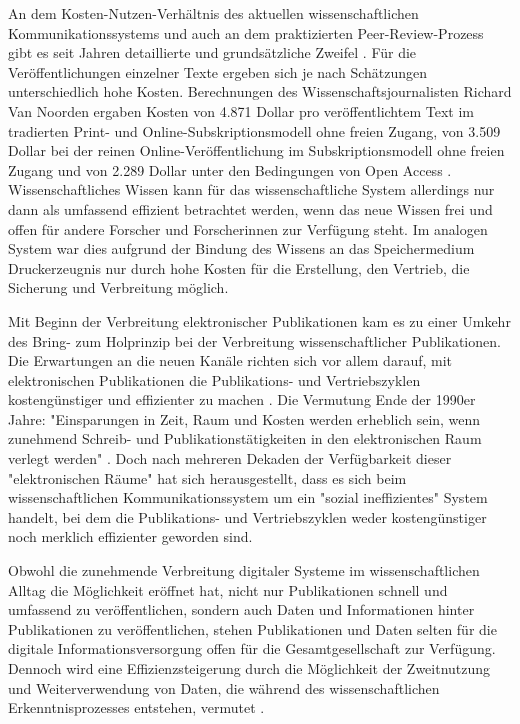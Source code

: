 An dem Kosten-Nutzen-Verhältnis des aktuellen wissenschaftlichen Kommunikationssystems und auch an dem praktizierten Peer-Review-Prozess \cite{Smith_2006} gibt es seit Jahren detaillierte und grundsätzliche Zweifel \cite{Brembs_2013a}. Für die Veröffentlichungen einzelner Texte ergeben sich je nach Schätzungen unterschiedlich hohe Kosten. Berechnungen des Wissenschaftsjournalisten Richard Van Noorden ergaben Kosten von 4.871 Dollar pro veröffentlichtem Text im tradierten Print- und Online-Subskriptionsmodell ohne freien Zugang, von 3.509 Dollar bei der reinen Online-Veröffentlichung im Subskriptionsmodell ohne freien Zugang und von 2.289 Dollar unter den Bedingungen von Open Access \cite{Van_Noorden_2013}. Wissenschaftliches Wissen kann für das wissenschaftliche System allerdings nur dann als umfassend effizient betrachtet werden, wenn das neue Wissen frei und offen für andere Forscher und Forscherinnen zur Verfügung steht. Im analogen System war dies aufgrund der Bindung des Wissens an das Speichermedium Druckerzeugnis nur durch hohe Kosten für die Erstellung, den Vertrieb, die Sicherung und Verbreitung möglich.

Mit Beginn der Verbreitung elektronischer Publikationen kam es zu einer Umkehr des Bring- zum Holprinzip bei der Verbreitung wissenschaftlicher Publikationen. Die Erwartungen an die neuen Kanäle richten sich vor allem darauf, mit elektronischen Publikationen die Publikations- und Vertriebszyklen kostengünstiger und effizienter zu machen \cite{Brueggemann-Klein_1995}. Die Vermutung Ende der 1990er Jahre: "Einsparungen in Zeit, Raum und Kosten werden erheblich sein, wenn zunehmend Schreib- und Publikationstätigkeiten in den elektronischen Raum verlegt werden" \cite{Roberts_1999}. Doch nach mehreren Dekaden der Verfügbarkeit dieser "elektronischen Räume" hat sich herausgestellt, dass es sich beim wissenschaftlichen Kommunikationssystem um ein "sozial ineffizientes" System \cite[:47]{Mueller-Langer_2010} handelt, bei dem die Publikations- und Vertriebszyklen weder kostengünstiger noch merklich effizienter geworden sind.

Obwohl die zunehmende Verbreitung digitaler Systeme im wissenschaftlichen Alltag die Möglichkeit eröffnet hat, nicht nur Publikationen schnell und umfassend zu veröffentlichen, sondern auch Daten und Informationen hinter Publikationen zu veröffentlichen, stehen Publikationen und Daten selten für die digitale Informationsversorgung offen für die Gesamtgesellschaft zur Verfügung. Dennoch wird eine Effizienzsteigerung durch die Möglichkeit der Zweitnutzung und Weiterverwendung von Daten, die während des wissenschaftlichen Erkenntnisprozesses entstehen, vermutet \cite{RIN_2010}.

